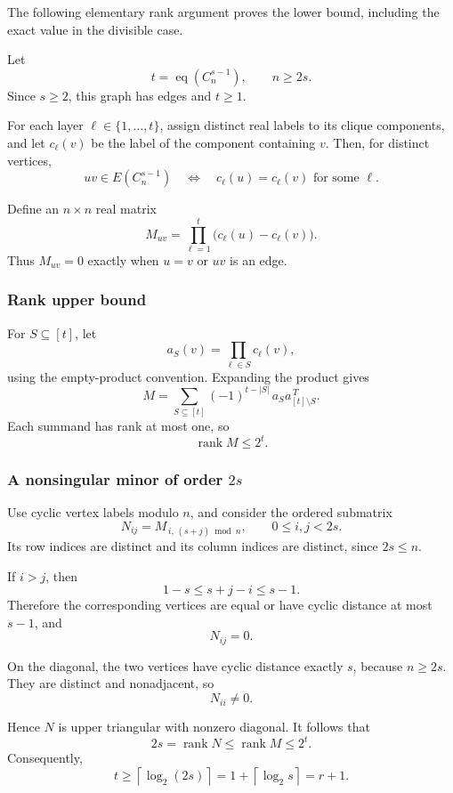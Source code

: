 \documentclass[
  11pt,
  a4paper,
]{article}
\begin{document}
The following elementary rank argument proves the lower bound, including
the exact value in the divisible case.

Let \[
t=\operatorname{eq}(C_n^{s-1}),\qquad n\ge2s.
\] Since \(s\ge2\), this graph has edges and \(t\ge1\).

For each layer \(\ell\in\{1,\dots,t\}\), assign distinct real labels to
its clique components, and let \(c_\ell(v)\) be the label of the
component containing \(v\). Then, for distinct vertices, \[
uv\in E(C_n^{s-1})
\quad\Longleftrightarrow\quad
c_\ell(u)=c_\ell(v)\text{ for some }\ell.
\]

Define an \(n\times n\) real matrix \[
M_{uv}
=
\prod_{\ell=1}^{t}\bigl(c_\ell(u)-c_\ell(v)\bigr).
\] Thus \(M_{uv}=0\) exactly when \(u=v\) or \(uv\) is an edge.

\subsubsection{Rank upper bound}\label{rank-upper-bound}

For \(S\subseteq[t]\), let \[
a_S(v)=\prod_{\ell\in S}c_\ell(v),
\] using the empty-product convention. Expanding the product gives \[
M
=
\sum_{S\subseteq[t]}
(-1)^{t-|S|}\,a_Sa_{[t]\setminus S}^{\,T}.
\] Each summand has rank at most one, so \[
\operatorname{rank}M\le2^t.
\]

\subsubsection{\texorpdfstring{A nonsingular minor of order
\(2s\)}{A nonsingular minor of order 2s}}\label{a-nonsingular-minor-of-order-2s}

Use cyclic vertex labels modulo \(n\), and consider the ordered
submatrix \[
N_{ij}=M_{\,i,\,(s+j)\bmod n},
\qquad 0\le i,j<2s.
\] Its row indices are distinct and its column indices are distinct,
since \(2s\le n\).

If \(i>j\), then \[
1-s\le s+j-i\le s-1.
\] Therefore the corresponding vertices are equal or have cyclic
distance at most \(s-1\), and \[
N_{ij}=0.
\]

On the diagonal, the two vertices have cyclic distance exactly \(s\),
because \(n\ge2s\). They are distinct and nonadjacent, so \[
N_{ii}\ne0.
\]

Hence \(N\) is upper triangular with nonzero diagonal. It follows that
\[
2s=\operatorname{rank}N
\le\operatorname{rank}M
\le2^t.
\] Consequently, \[
t\ge\left\lceil\log_2(2s)\right\rceil
=1+\left\lceil\log_2s\right\rceil
=r+1.
\]
\end{document}
